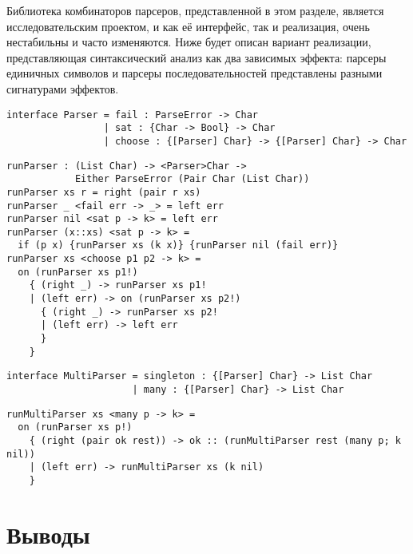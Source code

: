 \documentclass [a4paper] {article}
\begin{document}
Библиотека комбинаторов парсеров, представленной в этом разделе, является 
исследовательским проектом, и как её интерфейс, так и реализация, очень 
нестабильны и часто изменяются. Ниже будет описан вариант реализации, 
представляющая синтаксический анализ как два зависимых эффекта: парсеры 
единичных символов и парсеры последовательностей представлены разными
сигнатурами эффектов.   

\begin{verbatim}
interface Parser = fail : ParseError -> Char
                 | sat : {Char -> Bool} -> Char
                 | choose : {[Parser] Char} -> {[Parser] Char} -> Char
\end{verbatim}

\begin{verbatim}
runParser : (List Char) -> <Parser>Char -> 
            Either ParseError (Pair Char (List Char))
runParser xs r = right (pair r xs)
runParser _ <fail err -> _> = left err
runParser nil <sat p -> k> = left err
runParser (x::xs) <sat p -> k> = 
  if (p x) {runParser xs (k x)} {runParser nil (fail err)}
runParser xs <choose p1 p2 -> k> = 
  on (runParser xs p1!)
    { (right _) -> runParser xs p1!
    | (left err) -> on (runParser xs p2!) 
      { (right _) -> runParser xs p2!
      | (left err) -> left err
      }
    }
\end{verbatim}

\begin{verbatim}
interface MultiParser = singleton : {[Parser] Char} -> List Char
                      | many : {[Parser] Char} -> List Char
\end{verbatim}

\begin{verbatim}
runMultiParser xs <many p -> k> =    
  on (runParser xs p!) 
    { (right (pair ok rest)) -> ok :: (runMultiParser rest (many p; k nil))
    | (left err) -> runMultiParser xs (k nil)
    }
\end{verbatim}



\section{Выводы}

\printbibliography

\end{document}
